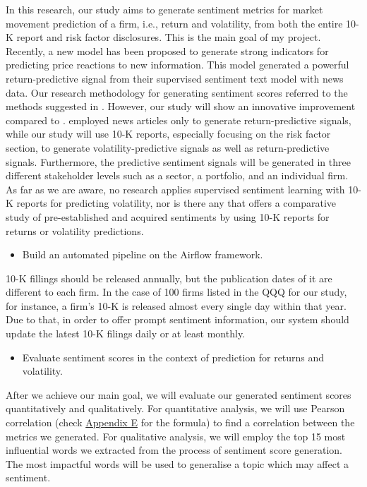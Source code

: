 \documentclass[logo,bsc,singlespacing,parskip]{infthesis}
\begin{document}
In this research, our study aims to generate sentiment metrics for market movement prediction of a firm, i.e., return and volatility, from both the entire 10-K report and risk factor disclosures. This is the main goal of my project. Recently, a new model has been proposed to generate strong indicators for predicting price reactions to new information. This model \cite{ke2020predicting} generated a powerful return-predictive signal from their supervised sentiment text model with news data. Our research methodology for generating sentiment scores referred to the methods suggested in \cite{ke2020predicting}. However, our study will show an innovative improvement compared to \cite{ke2020predicting}.  \cite{ke2020predicting} employed news articles only to generate return-predictive signals, while our study will use 10-K reports, especially focusing on the risk factor section, to generate volatility-predictive signals as well as return-predictive signals. Furthermore, the predictive sentiment signals will be generated in three different stakeholder levels such as a sector, a portfolio, and an individual firm. As far as we are aware, no research applies supervised sentiment learning with 10-K reports for predicting volatility, nor is there any that offers a comparative study of pre-established and acquired sentiments by using 10-K reports for returns or volatility predictions.

\begin{itemize}
    \item Build an automated pipeline on the Airflow framework.
\end{itemize}
10-K fillings should be released annually, but the publication dates of it are different to each firm. In the case of 100 firms listed in the QQQ for our study, for instance, a firm's 10-K is released almost every single day within that year. Due to that, in order to offer prompt sentiment information, our system should update the latest 10-K filings daily or at least monthly. 

\begin{itemize}
    \item Evaluate sentiment scores in the context of prediction for returns and volatility.
\end{itemize}
After we achieve our main goal, we will evaluate our generated sentiment scores quantitatively and qualitatively. For quantitative analysis, we will use Pearson correlation (check \hyperref[pearson-formula]{Appendix E} for the formula) to find a correlation between the metrics we generated. For qualitative analysis, we will employ the top 15 most influential words we extracted from the process of sentiment score generation. The most impactful words will be used to generalise a topic which may affect a sentiment. 
\end{document}
